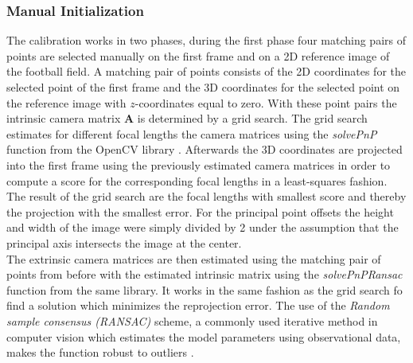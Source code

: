 \subsubsection{Manual Initialization}
The calibration works in two phases, during the first phase four matching pairs of points are selected manually on the first frame and on a 2D reference image of the football field. A matching pair of points consists of the 2D coordinates for the selected point of the first frame and the 3D coordinates for the selected point on the reference image with $z$-coordinates equal to zero. With these point pairs the intrinsic camera matrix $\mathbf{A}$ is determined by a grid search. The grid search estimates for different focal lengths the camera matrices using the \textit{solvePnP} function from the OpenCV library \cite{opencv}. Afterwards the 3D coordinates are projected into the first frame using the previously estimated camera matrices in order to compute a score for the corresponding focal lengths in a least-squares fashion. The result of the grid search are the focal lengths with smallest score and thereby the projection with the smallest error. For the principal point offsets the height and width of the image were simply divided by 2 under the assumption that the principal axis intersects the image at the center. \\
The extrinsic camera matrices are then estimated using the matching pair of points from before with the estimated intrinsic matrix using the \textit{solvePnPRansac} function from the same library. It works in the same fashion as the grid search fo find a solution which minimizes the reprojection error. The use of the \textit{Random sample consensus (RANSAC)}\cite{ransac} scheme, a commonly used iterative method in computer vision which estimates the model parameters using observational data, makes the function robust to outliers \cite{opencv}. 

